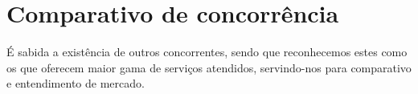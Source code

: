 \documentclass[
    12pt,               %
    openright,          %
    oneside,
    a4paper,            %
    MODELO,             %
    english,            %
    brazil              %
   ]{ifsp-spo-inf-ctds}
\begin{document}
    \begin{comment}
    \section{Hatron}
    Ofertam a terceirização de suporte \textit{help desk}, através de atendimento e, quando necessário, enviando técnicos para o ambiente local. Atendem demandas de rede, servidores, novos projetos de TI e consultoria. Atende pessoas jurídicas.
    
    \section{Mundo Open Tecnologia}
    Oferecem atendimento personalizado, atuando nas frentes de arquitetura, otimização de ambiente, \textit{help desk} e gerenciando a infraestrutura de TI. Atende pessoas jurídicas.
    
    \section{Fóruns Microsoft}
    Plataforma com grande base de conhecimentos, para que o usuário possa buscar erros nos produtos Microsoft e consiga ver problemas similares de outros usuários já resolvidos, ou ainda, incluir seu problema e aguardar um auxílio da comunidade. Serviço gratuito.
    
    \end{comment}
    
    
    \section{Comparativo de concorrência}
    É sabida a existência de outros concorrentes, sendo que reconhecemos estes como os que oferecem maior gama de serviços atendidos, servindo-nos para comparativo e entendimento de mercado.
    
\end{document}

